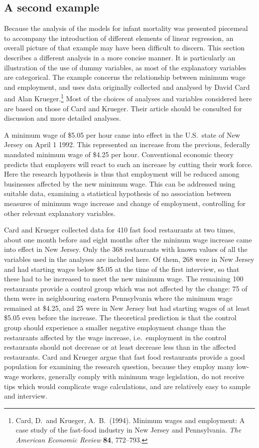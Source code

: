 \documentclass[11pt,a4paper,openany]{book}
\let\rmarkdownfootnote\footnote%
\def\footnote{\protect\rmarkdownfootnote}
\begin{document}
\subsection{A second example}\label{ss-regression-dummies-example}

Because the analysis of the models for infant mortality was presented
piecemeal to accompany the introduction of different elements of linear
regression, an overall picture of that example may have been difficult
to discern. This section describes a different analysis in a more
concise manner. It is particularly an illustration of the use of dummy
variables, as most of the explanatory variables are categorical. The
example concerns the relationship between minimum wage and employment,
and uses data originally collected and analysed by David Card and Alan
Krueger.\footnote{Card, D.~and Krueger, A.~B.~(1994). Minimum wages and
  employment: A case study of the fast-food industry in New Jersey and
  Pennsylvania. \emph{The American Economic Review} \textbf{84},
  772--793.} Most of the choices of analyses and variables considered
here are based on those of Card and Krueger. Their article should be
consulted for discussion and more detailed analyses.

A minimum wage of \$5.05 per hour came into effect in the U.S.~state of
New Jersey on April 1 1992. This represented an increase from the
previous, federally mandated minimum wage of \$4.25 per hour.
Conventional economic theory predicts that employers will react to such
an increase by cutting their work force. Here the research hypothesis is
thus that employment will be reduced among businesses affected by the
new minimum wage. This can be addressed using suitable data, examining a
statistical hypothesis of no association between measures of minimum
wage increase and change of employment, controlling for other relevant
explanatory variables.

Card and Krueger collected data for 410 fast food restaurants at two
times, about one month before and eight months after the mininum wage
increase came into effect in New Jersey. Only the 368 restaurants with
known values of all the variables used in the analyses are included
here. Of them, 268 were in New Jersey and had starting wages below
\$5.05 at the time of the first interview, so that these had to be
increased to meet the new minimum wage. The remaining 100 restaurants
provide a control group which was not affected by the change: 75 of them
were in neighbouring eastern Pennsylvania where the minimum wage
remained at \$4.25, and 25 were in New Jersey but had starting wages of
at least \$5.05 even before the increase. The theoretical prediction is
that the control group should experience a smaller negative employment
change than the restaurants affected by the wage increase,
i.e.~employment in the control restaurants should not decrease or at
least decrease less than in the affected restaurants. Card and Krueger
argue that fast food restaurants provide a good population for examining
the research question, because they employ many low-wage workers,
generally comply with minimum wage legislation, do not receive tips
which would complicate wage calculations, and are relatively easy to
sample and interview.
\end{document}
